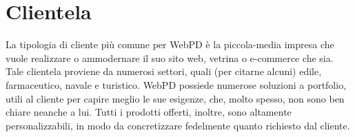 \section{Clientela}
La tipologia di cliente più comune per WebPD è la piccola-media impresa che vuole realizzare o ammodernare il suo sito web, vetrina o e-commerce che sia. Tale clientela proviene da numerosi settori, quali (per citarne alcuni) edile, farmaceutico, navale e turistico. WebPD possiede numerose soluzioni a portfolio, utili al cliente per capire meglio le sue esigenze, che, molto spesso, non sono ben chiare neanche a lui. Tutti i prodotti offerti, inoltre, sono altamente personalizzabili, in modo da concretizzare fedelmente quanto richiesto dal cliente.
